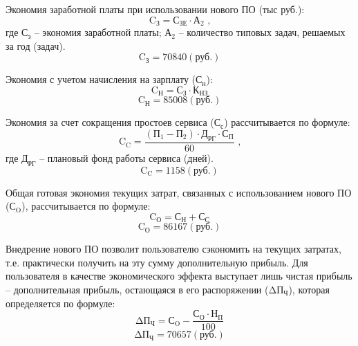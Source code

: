 Экономия заработной платы при использовании нового ПО (тыс руб.):
\begin{equation}
\label{sec:economics:effect:form_zp}
{\text{C}}_{\text{З}} = {\text{С}}_{\text{ЗЕ}} \cdot {\text{А}}_{\text{2}} \text{ ,}
\end{equation}
где ${\text{С}}_{\text{з}}$ -- экономия заработной платы; ${\text{А}}_{\text{2}}$ -- количество типовых задач, решаемых за год (задач).
$${\text{C}}_{\text{З}} = 70840 (\text{руб.})$$

Экономия с учетом начисления на зарплату (${\text{С}}_{\text{н}}$):
\begin{equation}
\label{sec:economics:effect:form_nach}
{\text{C}}_{\text{Н}} = {\text{С}}_{\text{З}} \cdot {\text{К}}_{\text{НЗ}}
\end{equation}
$${\text{C}}_{\text{Н}} = 85008 (\text{руб.})$$

Экономия за счет сокращения простоев сервиса (${\text{С}}_{\text{с}}$) рассчитывается по  формуле:
\begin{equation}
\label{sec:economics:effect:form_prost}
{\text{C}}_{\text{C}} = \frac{ ( {\text{П}}_{\text{1}} - {\text{П}}_{\text{2}} ) \cdot {\text{Д}}_{\text{РГ}} \cdot {\text{С}}_{\text{П}} }{ 60 } \text{ ,}
\end{equation}
где ${\text{Д}}_{\text{РГ}}$ -- плановый фонд работы сервиса (дней).
$${\text{C}}_{\text{C}} = 1158 (\text{руб.})$$

Общая готовая экономия текущих затрат, связанных с использованием нового ПО (${\text{С}}_{\text{O}}$), рассчитывается по формуле:
\begin{equation}
\label{sec:economics:effect:form_jew_big}
{\text{C}}_{\text{О}} = {\text{С}}_{\text{Н}} + {\text{С}}_{\text{С}}
\end{equation}
$${\text{C}}_{\text{О}} = 86167 (\text{руб.})$$

Внедрение нового ПО позволит пользователю сэкономить на текущих затратах, т.е. практически получить на эту сумму дополнительную прибыль. Для пользователя в качестве экономического эффекта выступает лишь чистая прибыль -- дополнительная прибыль, остающаяся в его распоряжении (${\text{ΔП}}_{\text{Ч}}$), которая определяется по формуле:
\begin{equation}
\label{sec:economics:effect:form_dpch}
{\text{ΔП}}_{\text{Ч}} = {\text{С}}_{\text{O}} - \frac{ {\text{С}}_{\text{О}} \cdot {\text{Н}}_{\text{П}} }{ 100 }
\end{equation}
$${\text{ΔП}}_{\text{Ч}} = 70657 (\text{руб.})$$

